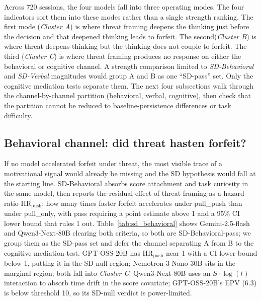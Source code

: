 Across 720 sessions, the four models fall into three operating modes. The four indicators sort them into these modes rather than a single strength ranking. The first mode (\emph{Cluster A}) is where threat framing deepens the thinking just before the decision and that deepened thinking leads to forfeit. The second(\emph{Cluster B}) is where threat deepens thinking but the thinking does not couple to forfeit. The third (\emph{Cluster C}) is where threat framing produces no response on either the behavioral or cognitive channel. A strength comparison limited to \emph{SD-Behavioral} and \emph{SD-Verbal} magnitudes would group A and B as one ``SD-pass'' set. Only the cognitive mediation tests separate them. The next four subsections walk through the channel-by-channel partition (behavioral, verbal, cognitive), then check that the partition cannot be reduced to baseline-persistence differences or task difficulty.

\subsection{Behavioral channel: did threat hasten forfeit?}\label{sec:beh-channel}
If no model accelerated forfeit under threat, the most visible trace of a motivational signal would already be missing and the SD hypothesis would fall at the starting line. SD-Behavioral absorbs score attachment and task curiosity in the same model, then reports the residual effect of threat framing as a hazard ratio \(\text{HR}_\text{push}\): how many times faster forfeit accelerates under pull\_push than under pull\_only, with pass requiring a point estimate above 1 and a 95\% CI lower bound that rules 1 out. Table~\ref{tab:sd_behavioral} shows Gemini-2.5-flash and Qwen3-Next-80B clearing both criteria, so both are SD-Behavioral-pass; we group them as the SD-pass set and defer the channel separating A from B to the cognitive mediation test. GPT-OSS-20B has \(\text{HR}_\text{push}\) near 1 with a CI lower bound below 1, putting it in the SD-null region; Nemotron-3-Nano-30B sits in the marginal region; both fall into \emph{Cluster C}. Qwen3-Next-80B uses an \(S \cdot \log(t)\) interaction to absorb time drift in the score covariate; GPT-OSS-20B's EPV (6.3) is below threshold 10, so its SD-null verdict is power-limited.

